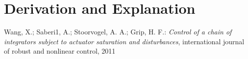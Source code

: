 \documentclass[10pt,a4paper]{article}
\begin{document}
		

	
	\section{Derivation and Explanation} %
	
	
	\begin{thebibliography}{10}		
		Wang, X.; Saberi1, A.; Stoorvogel, A. A.; Grip, H. F.: 
		\textit{Control of a chain of integrators subject to actuator saturation and disturbances}, international journal of robust and nonlinear control, 2011
	\end{thebibliography}
\end{document}
